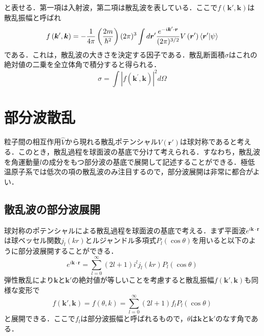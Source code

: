 \documentclass[11pt,a4j,notitlepage]{jreport}
\begin{document}
と表せる．第一項は入射波，第二項は散乱波を表している．ここで$f\left(\bm{k}', \bm{k}\right)$は散乱振幅と呼ばれ
\begin{equation}
	f\left(\boldsymbol{k}^{\prime}, \boldsymbol{k}\right)
	 = -\frac{1}{4 \pi}\left(\frac{2 m}{\hbar^{2}}\right)(2 \pi)^{3} \int d \bm{r}^{\prime} \frac{e^{-i \bm{k}^{\prime} \cdot \bm{r}}}{(2 \pi)^{3 / 2}} V \left(\bm{r}^{\prime}\right) \braket{\bm{r}' | \psi}
	 \label{eq2.1.10}
\end{equation}
である．これは，散乱波の大きさを決定する因子である．散乱断面積$\sigma$はこれの絶対値の二乗を全立体角で積分すると得られる．
\begin{equation}
	\sigma=\int\left|f\left(\boldsymbol{k}^{\prime}, \boldsymbol{k}\right)\right|^{2} d \Omega
	\label{eq2.1.11}
\end{equation}

\section{部分波散乱}
粒子間の相互作用$\hat{V}$から現れる散乱ポテンシャル$V(\bm{r}')$は球対称であると考える．このとき，散乱過程を球面波の基底で分けて考えられる．すなわち，散乱波を角運動量$l$の成分をもつ部分波の基底で展開して記述することができる．極低温原子系では低次の項の散乱波のみ注目するので，部分波展開は非常に都合がよい．

\subsection{散乱波の部分波展開}
球対称のポテンシャルによる散乱過程を球面波の基底で考える．まず平面波$e^{i \bm{k} \cdot \bm{r}}$は球ベッセル関数$j_{l}(k r)$とルジャンドル多項式$P_{l}(\cos \theta)$を用いると以下のように部分波展開することができる．
\begin{equation}
	e^{i \bm{k} \cdot \bm{r}} = \sum_{l=0}^{\infty}(2 l+1) i^{l} j_{l}(k r) P_{l}(\cos \theta)
	\label{eq2.2.1}
\end{equation}
弾性散乱により$\bm{k}$と$\bm{k}'$の絶対値が等しいことを考慮すると散乱振幅$f\left(\bm{k}', \bm{k}\right)$も同様な変形で
\begin{equation}
	f\left(\bm{k}', \bm{k}\right) = f(\theta, k)=\sum_{l=0}^{\infty}(2 l+1) f_{l} P_{l}(\cos \theta)
	\label{eq2.2.2}
\end{equation}
と展開できる．ここで$f_{l}$は部分波振幅と呼ばれるもので，$\theta$は$\bm{k}$と$\bm{k}'$のなす角である．
\end{document}
